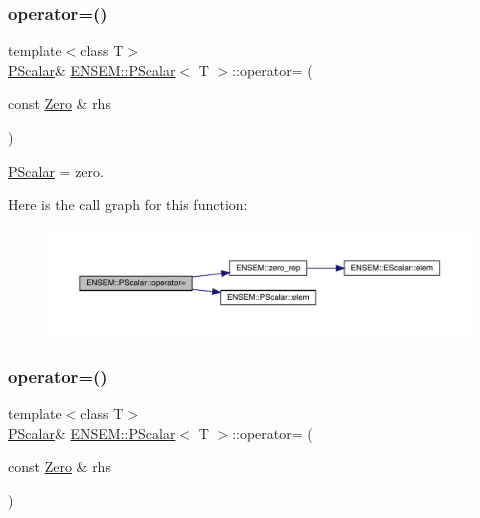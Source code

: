 \subsubsection{\texorpdfstring{operator=()}{operator=()}\hspace{0.1cm}{\footnotesize\ttfamily [2/6]}}
{\footnotesize\ttfamily template$<$class T$>$ \\
\mbox{\hyperlink{classENSEM_1_1PScalar}{P\+Scalar}}\& \mbox{\hyperlink{classENSEM_1_1PScalar}{E\+N\+S\+E\+M\+::\+P\+Scalar}}$<$ T $>$\+::operator= (\begin{DoxyParamCaption}\item[{const \mbox{\hyperlink{structENSEM_1_1Zero}{Zero}} \&}]{rhs }\end{DoxyParamCaption})\hspace{0.3cm}{\ttfamily [inline]}}



\mbox{\hyperlink{classENSEM_1_1PScalar}{P\+Scalar}} = zero. 

Here is the call graph for this function\+:
\nopagebreak
\begin{figure}[H]
\begin{center}
\leavevmode
\includegraphics[width=350pt]{d3/d27/classENSEM_1_1PScalar_a4357d579e24371f6384da9008f4512b3_cgraph}
\end{center}
\end{figure}
\mbox{\label{classENSEM_1_1PScalar_a4357d579e24371f6384da9008f4512b3}} 
\subsubsection{\texorpdfstring{operator=()}{operator=()}\hspace{0.1cm}{\footnotesize\ttfamily [3/6]}}
{\footnotesize\ttfamily template$<$class T$>$ \\
\mbox{\hyperlink{classENSEM_1_1PScalar}{P\+Scalar}}\& \mbox{\hyperlink{classENSEM_1_1PScalar}{E\+N\+S\+E\+M\+::\+P\+Scalar}}$<$ T $>$\+::operator= (\begin{DoxyParamCaption}\item[{const \mbox{\hyperlink{structENSEM_1_1Zero}{Zero}} \&}]{rhs }\end{DoxyParamCaption})\hspace{0.3cm}{\ttfamily [inline]}}



